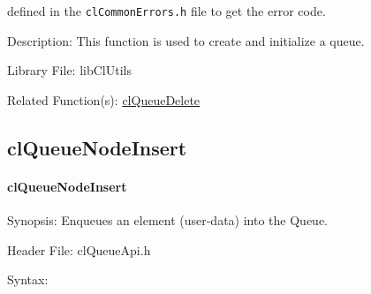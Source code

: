 \begin{flushleft}
\begin{Desc}
defined in the {\tt{clCommonErrors.h}} file to get the error code.\end{Desc}
\begin{Desc}
\item[Description:]This function is used to create and initialize a queue.\end{Desc}
\begin{Desc}
\item[Library File:]lib\-Cl\-Utils\end{Desc}
\begin{Desc}
\item[Related Function(s):]\hyperlink{pageq106}{cl\-Queue\-Delete} \end{Desc}
\newpage


\subsection{clQueueNodeInsert}
\hypertarget{pageq102}{}\paragraph{cl\-Queue\-Node\-Insert}\label{pageq102}
\begin{Desc}
\item[Synopsis:]Enqueues an element (user-data) into the Queue.\end{Desc}
\begin{Desc}
\item[Header File:]clQueueApi.h\end{Desc}
\begin{Desc}
\item[Syntax:]


\end{Desc}
\end{flushleft}
